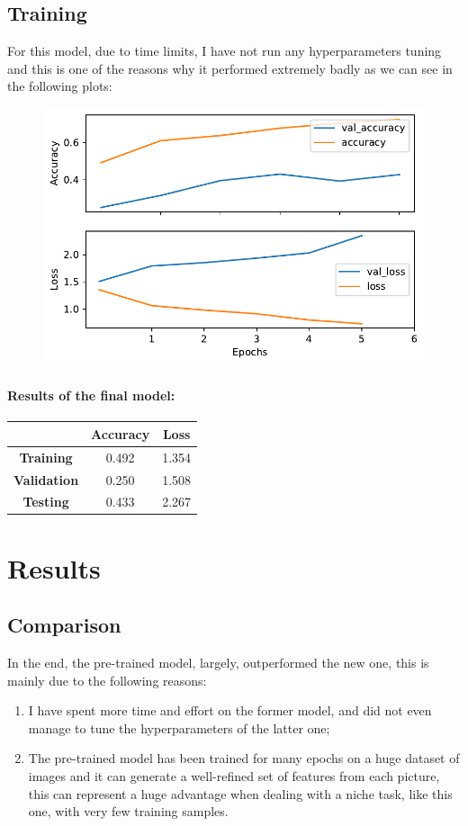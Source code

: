 \documentclass[a4paper]{article}
\begin{document}
\subsection{Training}
For this model, due to time limits, I have not run any hyperparameters tuning and this is one of the reasons why it performed extremely badly as we can see in the following plots:
\begin{figure} [h!]
\centering
\includegraphics[width=\textwidth]{new_final_train.pdf}
\label{fig: new_final_train}
\end{figure}
\paragraph{Results of the final model:}
\begin{center}
\begin{tabular}{|c|c|c|} 
 \hline
 & \textbf{Accuracy} & \textbf{Loss}\\ 
 \hline
 \textbf{Training} & 0.492 & 1.354 \\
 \textbf{Validation} & 0.250 & 1.508 \\
 \textbf{Testing} & 0.433 & 2.267 \\
 \hline
\end{tabular}
\end{center}
\newpage
\section{Results}
\subsection{Comparison}
In the end, the pre-trained model, largely, outperformed the new one, this is mainly due to the following reasons:
\begin{enumerate}
\item I have spent more time and effort on the former model, and did not even manage to tune the hyperparameters of the latter one;
\item The pre-trained model has been trained for many epochs on a huge dataset of images and it can generate a well-refined set of features from each picture, this can represent a huge advantage when dealing with a niche task, like this one, with very few training samples.
\end{enumerate}
\end{document}
